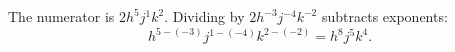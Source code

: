 The numerator is $2h^{5}j^{1}k^{2}$. Dividing by $2h^{-3}j^{-4}k^{-2}$ subtracts exponents:
\[
h^{5-(-3)}j^{1-(-4)}k^{2-(-2)}=\boxed{h^8j^5k^4}.
\]

